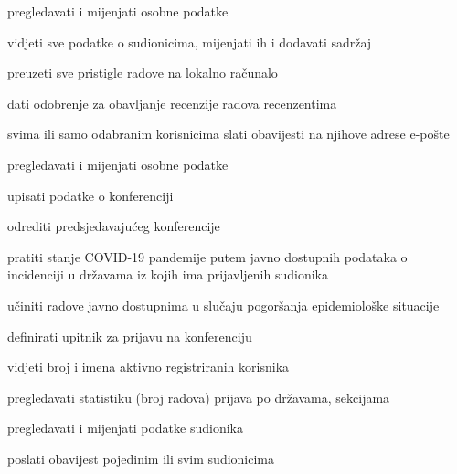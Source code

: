 \begin{packed_enum}
\begin{packed_enum}
\begin{packed_enum}
					
					\end{packed_enum}
				
					\item  {}
				
					\begin{packed_enum}
						
						\item pregledavati i mijenjati osobne podatke 
						\item vidjeti sve podatke o sudionicima, mijenjati ih i dodavati sadržaj
						\item preuzeti sve pristigle radove na lokalno računalo
						\item dati odobrenje za obavljanje recenzije radova recenzentima
						\item svima ili samo odabranim korisnicima slati obavijesti na njihove adrese e-pošte
					
				
					\end{packed_enum}
				
					\item  {}
				
					\begin{packed_enum}
						
						\item pregledavati i mijenjati osobne podatke 
						\item upisati podatke o konferenciji
						\item odrediti predsjedavajućeg konferencije
						\item pratiti stanje COVID-19 pandemije putem javno dostupnih podataka o incidenciji u državama iz kojih ima prijavljenih sudionika
						\item učiniti radove javno dostupnima u slučaju pogoršanja epidemiološke situacije
						\item definirati upitnik za prijavu na konferenciju
						\item vidjeti broj i imena aktivno registriranih korisnika
						\item pregledavati statistiku (broj radova) prijava po državama, sekcijama
						\item pregledavati i mijenjati podatke sudionika
						\item poslati obavijest pojedinim ili svim sudionicima 

					\end{packed_enum}
				\end{packed_enum}



\end{packed_enum}
